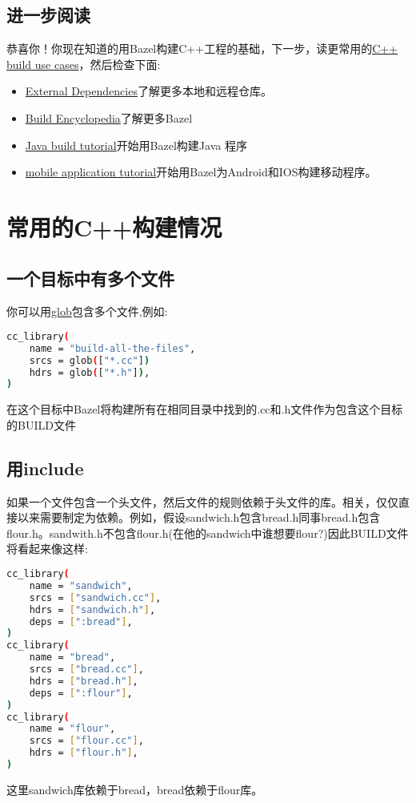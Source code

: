 \subsection{进一步阅读}
恭喜你！你现在知道的用Bazel构建C++工程的基础，下一步，读更常用的\href{https://docs.bazel.build/versions/master/tutorial/cpp-use-cases.html}{C++ build use cases}，然后检查下面:
\begin{itemize}
	\item \href{https://docs.bazel.build/versions/master/external.html}{External Dependencies}了解更多本地和远程仓库。
	\item \href{https://docs.bazel.build/versions/master/be/overview.html}{Build Encyclopedia}了解更多Bazel
	\item \href{https://docs.bazel.build/versions/master/tutorial/java.html}{Java build tutorial}开始用Bazel构建Java 程序
	\item \href{https://docs.bazel.build/versions/master/tutorial/app.html}{mobile application tutorial}开始用Bazel为Android和IOS构建移动程序。
\end{itemize}
\section{常用的C++构建情况}
\subsection{一个目标中有多个文件}
你可以用\href{https://docs.bazel.build/versions/master/be/functions.html#glob}{glob}包含多个文件,例如:
\begin{lstlisting}[language=Bash]
cc_library(
    name = "build-all-the-files",
    srcs = glob(["*.cc"])
    hdrs = glob(["*.h"]),
)
\end{lstlisting}
在这个目标中Bazel将构建所有在相同目录中找到的.cc和.h文件作为包含这个目标的BUILD文件
\subsection{用include}
如果一个文件包含一个头文件，然后文件的规则依赖于头文件的库。相关，仅仅直接以来需要制定为依赖。例如，假设sandwich.h包含bread.h同事bread.h包含flour.h。sandwith.h不包含flour.h(在他的sandwich中谁想要flour?)因此BUILD文件将看起来像这样:
\begin{lstlisting}[language=Bash]
cc_library(
    name = "sandwich",
    srcs = ["sandwich.cc"],
    hdrs = ["sandwich.h"],
    deps = [":bread"],
)
cc_library(
    name = "bread",
    srcs = ["bread.cc"],
    hdrs = ["bread.h"],
    deps = [":flour"],
)
cc_library(
    name = "flour",
    srcs = ["flour.cc"],
    hdrs = ["flour.h"],
)
\end{lstlisting}
这里sandwich库依赖于bread，bread依赖于flour库。
